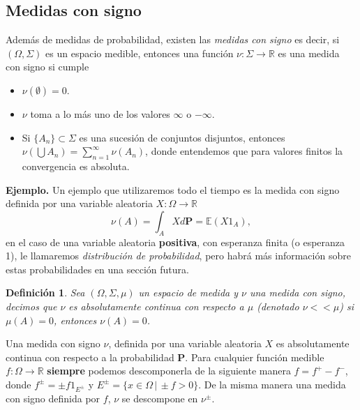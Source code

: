 \documentclass[letterpaper]{article}
\newtheorem{def.}{Definici\'on}[section]
\newcommand{\esp}{\mathbb E}
\newcommand{\eje}{{\newline \noindent \sc \textbf{Ejemplo. }}}
\newcommand{\om}{\ensuremath{\Omega}}
\newcommand{\sig}{\ensuremath{\Sigma}}
\newcommand{\re}{\ensuremath{\mathbb R }}
\begin{document}
\subsection{Medidas con signo}
\label{sec:org4a52639}

Además de medidas de probabilidad, existen las \emph{medidas con signo} es decir, si \((\Omega,\Sigma)\) es un espacio medible, entonces una función \(\nu:\Sigma\rightarrow\re\) es una medida con signo si cumple

\begin{itemize}
\item \(\nu(\emptyset)=0\).
\item \(\nu\) toma a lo más uno de los valores \(\infty\) o \(-\infty\).
\item Si \(\{A_n\}\subset\Sigma\) es una sucesión de conjuntos disjuntos, entonces \(\nu(\bigcup A_n)=\sum_{n=1}^{\infty} \nu(A_n)\), donde entendemos que para valores finitos la convergencia es absoluta.
\end{itemize}

\eje Un ejemplo que utilizaremos todo el tiempo es la medida con signo definida por una variable aleatoria \(X:\Omega\rightarrow\re\)
\[
    \nu(A)=\int_{A} X d\textbf{P}=\esp(X1_{A}),
\]
en el caso de una variable aleatoria \textbf{positiva}, con esperanza finita (o esperanza 1), le llamaremos \emph{distribución de probabilidad}, pero habrá más información sobre estas probabilidades en una sección futura.
\begin{def.}
Sea \((\om,\sig,\mu)\) un espacio de medida y \(\nu\) una medida con signo, decimos que \(\nu\) es absolutamente continua con respecto a \(\mu\) (denotado \(\nu<<\mu\)) si \(\mu(A)=0\), entonces \(\nu(A)=0\).
\end{def.}
\noindent Una medida con signo \(\nu\), definida por una variable aleatoria \(X\) es absolutamente continua con respecto a la probabilidad \textbf{P}. Para cualquier función medible \(f:\Omega\rightarrow\re\) \textbf{siempre} podemos descomponerla de la siguiente manera \(f=f^{+}-f^{-}\), donde \(f^{\pm}=\pm f 1_{E^{\pm}}\) y \(E^{\pm}=\{x\in\Omega\,\vert\,\pm f >0\}\). De la misma manera una medida con signo definida por \(f\), \(\nu\) se descompone en \(\nu^{\pm}\).
\end{document}
